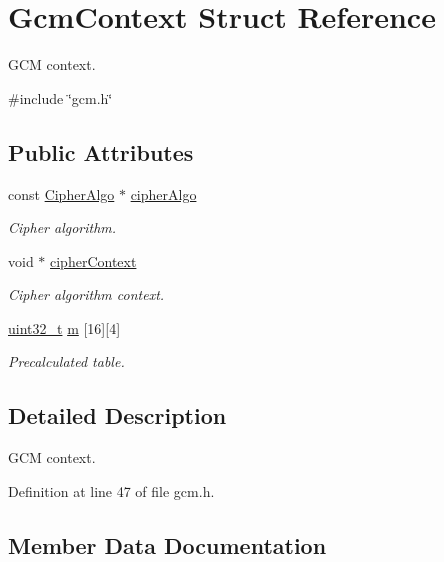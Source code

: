 \hypertarget{structGcmContext}{}\section{Gcm\+Context Struct Reference}
\label{structGcmContext}


G\+CM context.  




{\ttfamily \#include \char`\"{}gcm.\+h\char`\"{}}

\subsection*{Public Attributes}
\begin{DoxyCompactItemize}
\item 
const \hyperlink{structCipherAlgo}{Cipher\+Algo} $\ast$ \hyperlink{structGcmContext_afa015f0dceedd8d55d07d615048edb3b}{cipher\+Algo}
\begin{DoxyCompactList}\small\item\em Cipher algorithm. \end{DoxyCompactList}\item 
void $\ast$ \hyperlink{structGcmContext_aa5080560b185493361680b1b0a02c2ec}{cipher\+Context}
\begin{DoxyCompactList}\small\item\em Cipher algorithm context. \end{DoxyCompactList}\item 
\hyperlink{stdint_8h_a435d1572bf3f880d55459d9805097f62}{uint32\+\_\+t} \hyperlink{structGcmContext_af5ec6bf9a36e7a98a7645517d8b77733}{m} \mbox{[}16\mbox{]}\mbox{[}4\mbox{]}
\begin{DoxyCompactList}\small\item\em Precalculated table. \end{DoxyCompactList}\end{DoxyCompactItemize}


\subsection{Detailed Description}
G\+CM context. 

Definition at line 47 of file gcm.\+h.



\subsection{Member Data Documentation}
\mbox{\label{structGcmContext_afa015f0dceedd8d55d07d615048edb3b}} 
